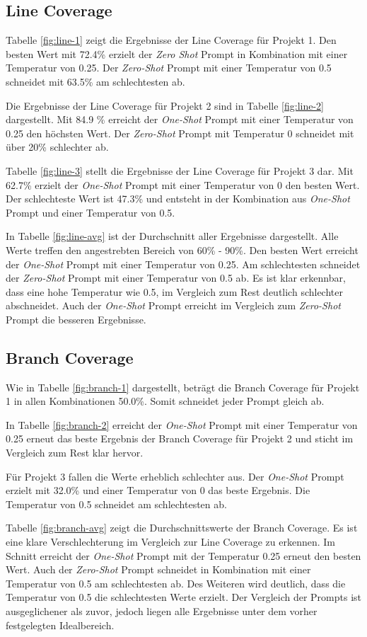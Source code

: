 \subsection{Line Coverage}
Tabelle \ref{fig:line-1} zeigt die Ergebnisse der Line Coverage für Projekt 1. Den besten Wert mit 72.4\% erzielt der \textit{Zero Shot} Prompt in Kombination mit einer Temperatur von 0.25. Der \textit{Zero-Shot} Prompt mit einer Temperatur von 0.5 schneidet mit 63.5\% am schlechtesten ab.

Die Ergebnisse der Line Coverage für Projekt 2 sind in Tabelle \ref{fig:line-2} dargestellt. Mit 84.9 \% erreicht der \textit{One-Shot} Prompt mit einer Temperatur von 0.25 den höchsten Wert. Der \textit{Zero-Shot} Prompt mit Temperatur 0 schneidet mit über 20\% schlechter ab.

Tabelle \ref{fig:line-3} stellt die Ergebnisse der Line Coverage für Projekt 3 dar. Mit 62.7\% erzielt der \textit{One-Shot} Prompt mit einer Temperatur von 0 den besten Wert. Der schlechteste Wert ist 47.3\% und entsteht in der Kombination aus \textit{One-Shot} Prompt und einer Temperatur von 0.5.

In Tabelle \ref{fig:line-avg} ist der Durchschnitt aller Ergebnisse dargestellt. Alle Werte treffen den angestrebten Bereich von 60\% - 90\%. Den besten Wert erreicht der \textit{One-Shot} Prompt mit einer Temperatur von 0.25. Am schlechtesten schneidet der \textit{Zero-Shot} Prompt mit einer Temperatur von 0.5 ab. Es ist klar erkennbar, dass eine hohe Temperatur wie 0.5, im Vergleich zum Rest deutlich schlechter abschneidet. Auch der \textit{One-Shot} Prompt erreicht im Vergleich zum \textit{Zero-Shot} Prompt die besseren Ergebnisse. 


\subsection{Branch Coverage}
Wie in Tabelle \ref{fig:branch-1} dargestellt, beträgt die Branch Coverage für Projekt 1 in allen Kombinationen 50.0\%. Somit schneidet jeder Prompt gleich ab.

In Tabelle \ref{fig:branch-2} erreicht der \textit{One-Shot} Prompt mit einer Temperatur von 0.25 erneut das beste Ergebnis der Branch Coverage für Projekt 2 und sticht im Vergleich zum Rest klar hervor.

Für Projekt 3 fallen die Werte erheblich schlechter aus. Der \textit{One-Shot} Prompt erzielt mit 32.0\% und einer Temperatur von 0 das beste Ergebnis. Die Temperatur von 0.5 schneidet am schlechtesten ab.

Tabelle \ref{fig:branch-avg} zeigt die Durchschnittswerte der Branch Coverage. Es ist eine klare Verschlechterung im Vergleich zur Line Coverage zu erkennen. Im Schnitt erreicht der \textit{One-Shot} Prompt mit der Temperatur 0.25 erneut den besten Wert. Auch der \textit{Zero-Shot} Prompt schneidet in Kombination mit einer Temperatur von 0.5 am schlechtesten ab. Des Weiteren wird deutlich, dass die Temperatur von 0.5 die schlechtesten Werte erzielt. Der Vergleich der Prompts ist ausgeglichener als zuvor, jedoch liegen alle Ergebnisse unter dem vorher festgelegten Idealbereich. 


